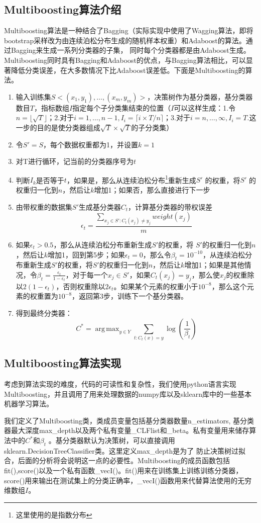 \documentclass[a4paper,oneside,12pt]{article}
\DeclareMathOperator*{\argmax}{arg\,max}
\begin{document}
\begin{spacing}{1.5}
\subsection{Multiboosting算法介绍}
Multiboosting算法是一种结合了Bagging（实际实现中使用了Wagging算法，即将bootstrap采样改为由连续泊松分布生成的随机样本权重）和Adaboost的算法。通过Bagging来生成一系列分类器的子集， 同时每个分类器都是由Adaboost生成。Multiboosting同时具有Bagging和Adaboost的优点，与Bagging算法相比，可以显著降低分类误差，在大多数情况下比Adaboost误差低。下面是Multiboosting的算法。
\begin{enumerate}
  \item 输入训练集$S<(x_1,y_1),\ldots,(x_m,y_m)>$，决策树作为基分类器，基分类器数目$T$，指标数组$I$指定每个子分类集结束的位置（$I$可以这样生成：1.令$n= \lfloor \sqrt{T} \rfloor $；2.对于$i=1,\ldots,n-1,I_i=\lceil i\times T/n \rceil $；3.对于$i=n,\ldots,\infty ,I_i=T$.这一步的目的是使分类器组成$\sqrt{T}\times \sqrt{T}$的子分类集）
  \item 令$S'=S$，每个数据权重都为1，并设置$k=1$
  \item 对T进行循环，记当前的分类器序号为$t$
  \item 判断$I_k$是否等于$t$，如果是，那么从连续泊松分布\footnote{这里使用的是指数分布}重新生成$S'$ 的权重，将$S'$ 的权重归一化到$n$，然后让$k$增加1；如果否，那么直接进行下一步
  \item 由带权重的数据集$S'$生成基分类器$C_t$，计算基分类器的带权误差
        \[ \epsilon_t=\frac{\sum_{x_j\in S':C_t(x_j)\neq y_j}weight(x_j)}{m}\]
  \item 如果$\epsilon_t>0.5$，那么从连续泊松分布重新生成$S'$的权重，将 $S'$的权重归一化到$n$，然后让$k$增加1，回到第5步；如果$\epsilon_t=0$，那么令$\beta_t=10^{-10}$，从连续泊松分布重新生成$S'$的权重，将$S'$的权重归一化到$n$，然后让$k$增加1；如果是其他情况，令$\beta_t=\frac{\epsilon_t}{1-\epsilon_t}$，对于每一个$x_j\in S'$，如果$C_t(x_j)= y_j$，那么使$x_j$的权重除以$2(1-\epsilon_t)$，否则权重除以$2\epsilon_t$。如果某个元素的权重小于$10^{-8}$，那么这个元素的权重置为$10^{-8}$，返回第3步，训练下一个基分类器。
  \item 得到最终分类器：
        \[ C^\ast=\argmax_{y \in Y}\sum_{t:C_t(x)=y} \log(\frac{1}{\beta_t}) \]
\end{enumerate}
\subsection{Multiboosting算法实现}
考虑到算法实现的难度，代码的可读性和复杂性，我们使用python语言实现Multiboosting，并且调用了用来处理数据的numpy库以及sklearn库中的一些基本机器学习算法。\par
我们定义了Multiboosting类，类成员变量包括基分类器数量n\_estimators, 基分类器最大深度max\_depth以及两个私有变量\_CLFlist和\_beta。私有变量用来储存算法中的$C^{\ast}$和$\beta_t$ 。基分类器默认为决策树，可以直接调用sklearn.DecisionTreeClassifier类。这里定义max\_depth是为了
防止决策树过拟合，后面的分析将会说明这一点的必要性。Multiboosting的成员函数包括fit(),score()以及一个私有函数\_vecI()。fit()用来在训练集上训练训练分类器，score()用来输出在测试集上的分类正确率，\_vecI()函数用来代替算法使用的无穷维数组$I$。\par



\end{spacing}
\end{document}
